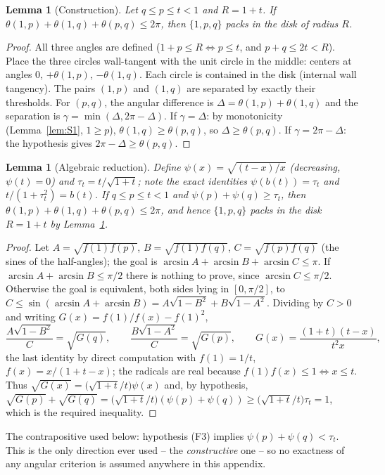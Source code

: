 \documentclass[11pt]{article}
\newtheorem{lemma}[theorem]{Lemma}
\theoremstyle{definition}
\begin{document}
\begin{lemma}[Construction]\label{lem:S2}
Let $q\le p\le t<1$ and $R=1+t$. If
$\theta(1,p)+\theta(1,q)+\theta(p,q)\le2\pi$, then $\{1,p,q\}$ packs in the
disk of radius $R$.
\end{lemma}
\begin{proof}
All three angles are defined ($1+p\le R\iff p\le t$, and $p+q\le2t<R$).
Place the three circles wall-tangent with the unit circle in the middle:
centers at angles $0$, $+\theta(1,p)$, $-\theta(1,q)$. Each circle is
contained in the disk (internal wall tangency). The pairs $(1,p)$ and
$(1,q)$ are separated by exactly their thresholds. For $(p,q)$, the angular
difference is $\Delta=\theta(1,p)+\theta(1,q)$ and the separation is
$\gamma=\min(\Delta,2\pi-\Delta)$. If $\gamma=\Delta$: by monotonicity
(Lemma~\ref{lem:S1}, $1\ge p$), $\theta(1,q)\ge\theta(p,q)$, so
$\Delta\ge\theta(p,q)$. If $\gamma=2\pi-\Delta$: the hypothesis gives
$2\pi-\Delta\ge\theta(p,q)$.
\end{proof}

\begin{lemma}[Algebraic reduction]\label{lem:S3}
Define $\psi(x)=\sqrt{(t-x)/x}$ (decreasing, $\psi(t)=0$) and
$\tau_t=t/\sqrt{1+t}$; note the exact identities $\psi(b(t))=\tau_t$ and
$t/(1+\tau_t^2)=b(t)$. If $q\le p\le t<1$ and $\psi(p)+\psi(q)\ge\tau_t$, then
$\theta(1,p)+\theta(1,q)+\theta(p,q)\le2\pi$, and hence $\{1,p,q\}$ packs
in the disk $R=1+t$ by Lemma~\ref{lem:S2}.
\end{lemma}
\begin{proof}
Let $A=\sqrt{f(1)f(p)}$, $B=\sqrt{f(1)f(q)}$, $C=\sqrt{f(p)f(q)}$ (the
sines of the half-angles); the goal is
$\arcsin A+\arcsin B+\arcsin C\le\pi$. If $\arcsin A+\arcsin B\le\pi/2$
there is nothing to prove, since $\arcsin C\le\pi/2$. Otherwise the goal is
equivalent, both sides lying in $[0,\pi/2]$, to
$C\le\sin(\arcsin A+\arcsin B)=A\sqrt{1-B^2}+B\sqrt{1-A^2}$. Dividing by
$C>0$ and writing $G(x)=f(1)/f(x)-f(1)^2$,
\[
\frac{A\sqrt{1-B^2}}{C}=\sqrt{G(q)},\qquad
\frac{B\sqrt{1-A^2}}{C}=\sqrt{G(p)},\qquad
G(x)=\frac{(1+t)(t-x)}{t^2x},
\]
the last identity by direct computation with $f(1)=1/t$,
$f(x)=x/(1+t-x)$; the radicals are real because $f(1)f(x)\le1\iff x\le t$.
Thus $\sqrt{G(x)}=\bigl(\sqrt{1+t}/t\bigr)\psi(x)$ and, by hypothesis,
$\sqrt{G(p)}+\sqrt{G(q)}=\bigl(\sqrt{1+t}/t\bigr)(\psi(p)+\psi(q))
\ge\bigl(\sqrt{1+t}/t\bigr)\tau_t=1$, which is the required inequality.
\end{proof}

The contrapositive used below: hypothesis (F3) implies
$\psi(p)+\psi(q)<\tau_t$. This is the only direction ever used -- the
\emph{constructive} one -- so no exactness of any angular criterion is
assumed anywhere in this appendix.
\end{document}
